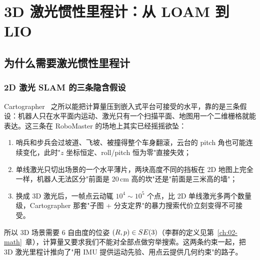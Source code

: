 \chapter{3D 激光惯性里程计：从 LOAM 到 LIO}\label{ch:16-lio-evolution}

\usetikzlibrary{arrows.meta, positioning, calc, shapes.geometric}


\section{为什么需要激光惯性里程计}\label{sec:16-why}

\subsection{2D 激光 SLAM 的三条隐含假设}

Cartographer~\cite{hess2016cartographer} 之所以能把计算量压到嵌入式平台可接受的水平，靠的是三条假设：机器人只在水平面内运动、激光只有一个扫描平面、地图用一个二维栅格就能表达。这三条在 RoboMaster 的场地上其实已经摇摇欲坠：

\begin{enumerate}
  \item 哨兵和步兵会过坡道、飞坡、被撞得整个车身翻滚，云台的 pitch 角也可能连续变化，此时"$z$ 坐标恒定、roll/pitch 恒为零"直接失效；
  \item 单线激光只切出场景的一个水平薄片，两块高度不同的挡板在 2D 地图上完全一样，机器人无法区分"前面是 20\,cm 高的坎"还是"前面是三米高的墙"；
  \item 换成 3D 激光后，一帧点云动辄 $10^4\sim10^5$ 个点，比 2D 单线激光多两个数量级，Cartographer 那套"子图 + 分支定界"的暴力搜索代价立刻变得不可接受。
\end{enumerate}

所以 3D 场景需要 6 自由度的位姿 $(R,p)\in SE(3)$（李群的定义见第~\ref{ch:02-math}~章），计算量又要求我们不能对全部点做穷举搜索。这两条约束一起，把 3D 激光里程计推向了"用 IMU 提供运动先验、用点云提供几何约束"的路子。

